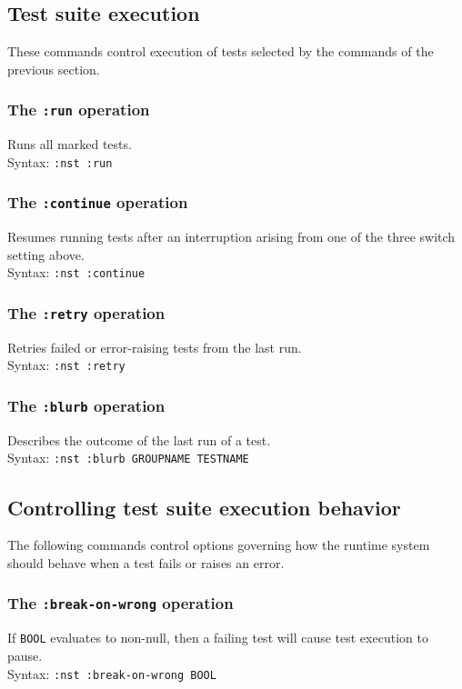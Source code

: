 \subsection{Test suite execution}
These commands control execution of tests selected by the commands of
the previous section.

\subsubsection{The \texttt{:run} operation}
%
Runs all marked tests.
\\ Syntax: \texttt{:nst :run}

\subsubsection{The \texttt{:continue} operation}
%
Resumes running tests after an interruption arising from one of the
three switch setting above.
\\ Syntax: \texttt{:nst :continue}

\subsubsection{The \texttt{:retry} operation}
%
Retries failed or error-raising tests from the last run.
\\ Syntax: \texttt{:nst :retry}

\subsubsection{The \texttt{:blurb} operation}
%
Describes the outcome of the last run of a test.
\\ Syntax: \texttt{:nst :blurb GROUPNAME TESTNAME}

\subsection{Controlling test suite execution behavior}
The following commands control options governing how the runtime
system should behave when a test fails or raises an error.

\subsubsection{The \texttt{:break-on-wrong} operation}
%
If \texttt{BOOL} evaluates to non-null, then a failing test will cause
test execution to pause.
\\ Syntax: \texttt{:nst :break-on-wrong BOOL}

